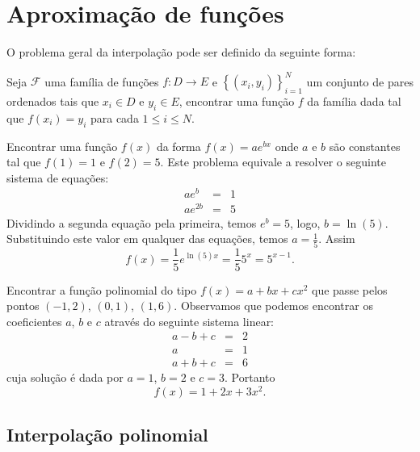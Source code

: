
%

\chapter{Aproximação de funções}

O problema geral da interpolação pode ser definido da seguinte forma:

Seja $\mathcal{F}$ uma família de funções $f:D\to E$ e $\left\{(x_i,y_i)\right\}_{i=1}^N$ um conjunto de pares ordenados tais que $x_i\in D$ e $y_i\in E$, encontrar uma função $f$ da família dada tal que $f(x_i)=y_i$ para cada $1\leq i \leq N$.
\begin{ex} Encontrar uma função $f(x)$ da forma $f(x)=a e^{bx}$ onde $a$ e $b$ são constantes tal que $f(1)=1$ e $f(2)=5$. Este problema equivale a resolver o seguinte sistema de equações:
\begin{eqnarray*}
ae^b&=&1\\
ae^{2b}&=&5
\end{eqnarray*}
Dividindo a segunda equação pela primeira, temos $e^b=5$, logo, $b=\ln(5)$. Substituindo este valor em qualquer das equações, temos $a=\frac{1}{5}$. Assim $$f(x)=\frac{1}{5}e^{\ln(5) x}=\frac{1}{5}5^x=5^{x-1}.$$
\end{ex}

\begin{ex} Encontrar a função polinomial do tipo $f(x)=a+bx+cx^2$ que passe pelos pontos $(-1,2)$, $(0,1)$, $(1,6)$. Observamos que podemos encontrar os coeficientes $a$, $b$ e $c$ através do seguinte sistema linear:
\begin{eqnarray*}
a-b+c&=&2\\
a&=&1\\
a+b+c&=&6
\end{eqnarray*}
cuja solução é dada por $a=1$, $b=2$ e $c=3$. Portanto $$f(x)=1+2x+3x^2.$$
\end{ex}

\section{Interpolação polinomial}

